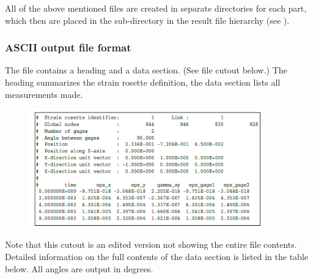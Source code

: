 {All of the above mentioned files are created in separate directories for each
part, which then are placed in the sub-directory
 in the result file hierarchy
(see ).

\subsubsection{ASCII output file format}

The  file contains a heading and a data section.
(See file cutout below.) The heading summarizes the strain rosette definition,
the data section lists all measurements made.

\begin{figure}[!h]
  \center
  \includegraphics[width=0.9\textwidth]{Figures/6-StrainRosette-TextOutput}
\end{figure}

\clearpage
Note that this cutout is an edited version not showing the entire file contents.
Detailed information on the full contents of the data section is listed
in the table below. All angles are output in degrees.

}
